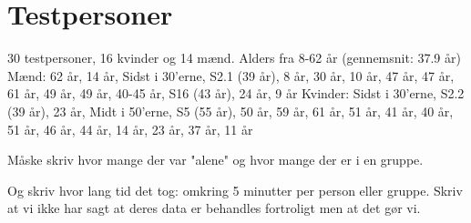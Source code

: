 \section{Testpersoner}
\label{ParametreTestpersoner}
%

30 testpersoner, 16 kvinder og 14 mænd. Alders fra 8-62 år (gennemsnit: 37.9 år)
Mænd: 62 år, 14 år, Sidst i 30'erne, S2.1 (39 år), 8 år, 30 år, 10 år, 47 år, 47 år, 61 år, 49 år, 49 år, 40-45 år, S16 (43 år), 24 år, 9 år
Kvinder: Sidst i 30'erne, S2.2 (39 år), 23 år, Midt i 50'erne, S5 (55 år), 50 år, 59 år, 61 år, 51 år, 41 år, 40 år, 51 år, 46 år, 44 år, 14 år, 23 år, 37 år, 11 år


Måske skriv hvor mange der var "alene" og hvor mange der er i en gruppe. 

 Og skriv hvor lang tid det tog: omkring 5 minutter per person eller gruppe. Skriv at vi ikke har sagt at deres data er behandles fortroligt men at det gør vi.  

